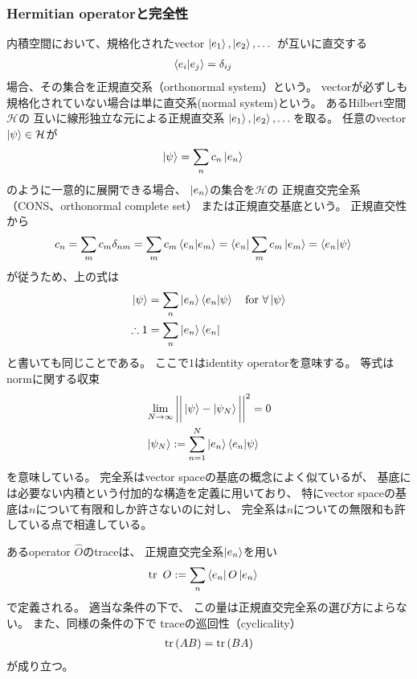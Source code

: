 \subsubsection{Hermitian operatorと完全性}

内積空間において、規格化されたvector
$\ket{e_1},\ket{e_2},\dots$
が互いに直交する
\begin{align}
    \braket{e_i | e_j} &= \delta_{ij}
\end{align}
場合、その集合を正規直交系（orthonormal system）という。
vectorが必ずしも規格化されていない場合は単に直交系(normal system)という。
あるHilbert空間$\mathcal{H}$の
互いに線形独立な元による正規直交系
$\ket{e_1},\ket{e_2},\dots$を取る。
任意のvector
$\ket{\psi} \in \mathcal{H}$が
\begin{align}
    \ket{\psi}
    &=\sum_n c_n \ket{e_n}
\end{align}
のように一意的に展開できる場合、
$\ket{e_n}$の集合を$\mathcal{H}$の
正規直交完全系（CONS、orthonormal complete set）
または正規直交基底という。
正規直交性から
\begin{align}
    c_n &=
    \sum_m c_m \delta_{nm}
    =\sum_m c_m \braket{e_n|e_m}
    = \bra{e_n} \sum_m c_m \ket{e_m}
    = \braket{e_n | \psi}
\end{align}
が従うため、上の式は
\begin{align}
    \ket{\psi}
    &=\sum_n \ket{e_n} \braket{e_n | \psi}
    \quad\text{for $\forall \ket{\psi}$}
\notag\\
\therefore
    1
    &=
    \sum _n \ket{e_n}\bra{e_n}
\end{align}
と書いても同じことである。
ここで$1$はidentity operatorを意味する。
等式はnormに関する収束
\begin{subequations}
\begin{align}
    &\lim_{N\to\infty}\bigg|\bigg|
        \ket{\psi} - \ket{\psi_N}
    \bigg|\bigg|^2
    = 0
\label{convergence of norm}
\\
    &\ket{\psi_N}
    :=
    \sum_{n=1}^N \ket{e_n} \braket{e_n | \psi}
\end{align}
\end{subequations}
を意味している。
完全系はvector spaceの基底の概念によく似ているが、
基底には必要ない内積という付加的な構造を定義に用いており、
特にvector spaceの基底は$n$について有限和しか許さないのに対し、
完全系は$n$についての無限和も許している点で相違している。

あるoperator $\hat{O}$のtraceは、
正規直交完全系$\ket{e_n}$を用い
\begin{align}
    \tr\ O
    &:=
    \sum_n\bra{e_n} O \ket{e_n}
\end{align}
で定義される。
適当な条件の下で、
この量は正規直交完全系の選び方によらない。
また、同様の条件の下で
traceの巡回性（cyclicality）
\begin{align}
    \tr\left(
        AB
    \right)
    =
    \tr\left(
        BA
    \right)
\end{align}
が成り立つ。

